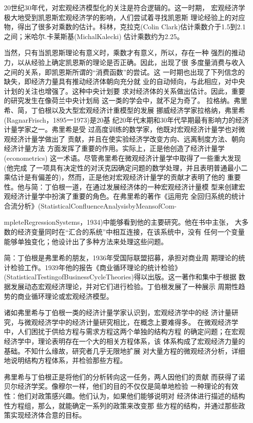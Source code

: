 20世纪30年代，对宏观经济模型化的关注是符合逻辑的。这一时期，
宏观经济学极大地受到凯恩斯宏观经济学的影响，人们尝试着寻找凯恩斯
理论经验上的对应物，得出了很多对乘数的估计。科林，克拉克(Colin
Clark)估计乘数介于1.5到2.1之间；米哈尔.卡莱斯基(MichalKalecki)
估计乘数约为2.25。

当然，只有当凯恩斯理论有意义时，乘数才有意义，所以，存在一种
强烈的推动力，以从经验上确定凯恩斯的理论是否正确。因此，出现了很
多度量消费与收入之间的关系，即凯恩斯所谓的“消费函数”的尝试。这
一时期也出现了下列信念的缺失，即经济力量具有推动经济体朝向充分就
业的自动倾向，与此相应，对中央计划的关注也增强了。这种中央计划要
求对经济体的关系做出估计。因此，重要的研究发生在像荷兰中央计划局
这一类的学会中，就不足为奇了。
拉格纳。弗里希、简，丁伯根以及大型宏观经济计重模型的发展
挪威经济学家拉格纳，弗里希(RagnarFrisch，1895一1973)是20基
纪20年代末期和30年代早期最有影响力的经济计量学家之一。弗里希是受
过高度训练的数学家，他既对宏观经济计量学也对微观经济计量学做出了
贡献，并且在使实验经济学改变方向、远离制度方法、朝向经济计量方法
方面发挥了重要的作用。实际上，正是他创造了经济计量学(econometrics)
这一术语。尽管弗里希在微观经济计量学中取得了一些重大发现(他完成
了一项具有决定性的对沃克因确定问题的数学处理，并且表明普通最小二
乘估计是有偏差的)，然而，正是他对宏观经济计量学的贡献才表明了他的
重要性。他与简：丁伯根一道，在通过发展经济体的一种宏观经济计量模
型来创建宏观经济计量学中扮演了重要的角色。在弗里希的著作《运用完
全回归系统的统计合流分析》(StatisticalConfluenceAnalysisbyMeansofCom-


mpleteRegressionSystems，1934)中能够看到他的主要研究。他在书中主张，
大多数的经济变量同时在“汇合的系统”中相互连接，在该系统中，没有
任何一个变量能够单独变化；他设计出了多种方法来处理这些问题。

简：丁伯根是弗里希的朋友，1936年受国际联盟招募，承担对商业周
期理论的统计检验工作。1939年他的报告《商业循环理论的统计检验》
(StatisticalTestingofBusinessCycleTheories)得以出版。这一著作和集中于根据
数据发展动态宏观经济理论，并对它们进行检验。丁伯根发展了一种展示
周期性趋势的商业循环理论或宏观经济模型。

诸如弗里希与丁伯根一类的经济计量学家认识到，宏观经济学中的经
济计量研究，与微观经济学中的经济计量研究相比，在概念上要难得多。
在微观经济学中，人们困扰于供给方程与需求方程这两个单独的结构方程
的确定问题；在宏观经济学中，理论表明存在一个大的相关方程体系，该
体系构成了宏观经济力量的基础。不知什么缘故，研究者几乎无限地扩展
对大量方程的微观经济分析，详细地说明结构方程体系，并检验那些方程。

弗里希与丁伯根正是将他们的分析转向这一任务，两人因他们的贡献
而获得了诺贝尔经济学奖。像穆尔一样，他们的目的不仅仅是简单地检验
一种理论的有效性：他们对政策感兴趣。他们认为，如果他们能够说明对
经济体进行描述的结构性方程组，那么，就能确定一系列的政策来改变那
些方程的结构，并通过那些政策实现经济体合意的目标。

